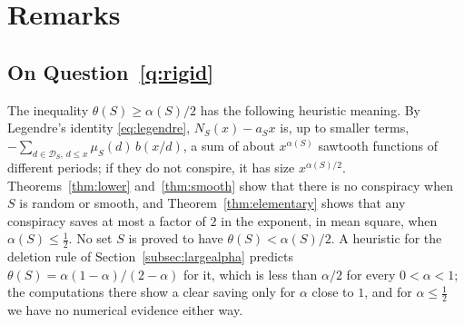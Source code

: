\documentclass[11pt]{amsart}
\theoremstyle{remark}
\numberwithin{equation}{section}
\newcommand{\cD}{\mathcal{D}}
\begin{document}
\section{Remarks}\label{sec:remarks}

\subsection{On Question~\ref{q:rigid}}
The inequality $\theta(S)\ge\alpha(S)/2$ has the following heuristic meaning. By Legendre's identity \eqref{eq:legendre}, $N_S(x)-a_Sx$ is, up to smaller terms, $-\sum_{d\in\cD_S,\,d\le x}\mu_S(d)\,b(x/d)$, a sum of about $x^{\alpha(S)}$ sawtooth functions of different periods; if they do not conspire, it has size $x^{\alpha(S)/2}$. Theorems~\ref{thm:lower} and~\ref{thm:smooth} show that there is no conspiracy when $S$ is random or smooth, and Theorem~\ref{thm:elementary} shows that any conspiracy saves at most a factor of $2$ in the exponent, in mean square, when $\alpha(S)\le\tfrac12$. No set $S$ is proved to have $\theta(S)<\alpha(S)/2$. A heuristic for the deletion rule of Section~\ref{subsec:largealpha} predicts $\theta(S)=\alpha(1-\alpha)/(2-\alpha)$ for it, which is less than $\alpha/2$ for every $0<\alpha<1$; the computations there show a clear saving only for $\alpha$ close to $1$, and for $\alpha\le\tfrac12$ we have no numerical evidence either way.
\end{document}
